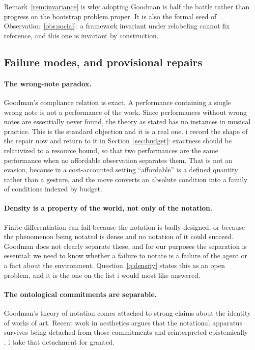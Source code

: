 \noindent
Remark~\ref{rem:invariance} is why adopting Goodman is half the
battle rather than progress on the bootstrap problem proper.
It is also the formal seed of Observation~\ref{obs:social}: a
framework invariant under relabeling cannot fix reference, and
this one is invariant by construction.

\subsection{Failure modes, and provisional repairs}
\label{sec:failures}

\paragraph{The wrong-note paradox.}
Goodman's compliance relation is exact.
A performance containing a single wrong note is not a performance
of the work.
Since performances without wrong notes are essentially never found,
the theory as stated has no instances in musical practice.
This is the standard objection and it is a real one.
i record the shape of the repair now and return to it in
Section~\ref{sec:budget}: exactness should be relativized to a
resource bound, so that two performances are the same performance
when no affordable observation separates them.
That is not an evasion, because in a cost-accounted setting
``affordable'' is a defined quantity rather than a gesture, and the
move converts an absolute condition into a family of conditions
indexed by budget.

\paragraph{Density is a property of the world, not only of the notation.}
Finite differentiation can fail because the notation is badly
designed, or because the phenomenon being notated is dense and no
notation of it could succeed.
Goodman does not clearly separate these, and for our purposes the
separation is essential: we need to know whether a failure to
notate is a failure of the agent or a fact about the environment.
Question~\ref{q:density} states this as an open problem, and it is
the one on the list i would most like answered.

\paragraph{The ontological commitments are separable.}
Goodman's theory of notation comes attached to strong claims about
the identity of works of art.
Recent work in aesthetics argues that the notational apparatus
survives being detached from those commitments and reinterpreted
epistemically \cite{estetika2026}.
i take that detachment for granted.

